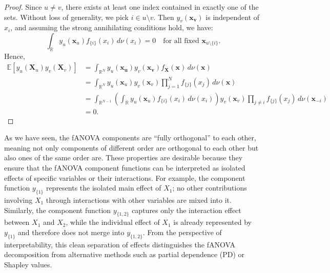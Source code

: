 \begin{proof}
Since $u \neq v$, there exists at least one index contained in exactly one of the sets.
Without loss of generality, we pick $i \in u \setminus v$.
Then $y_v(\boldsymbol{x_v})$ is independent of $x_i$, and assuming the strong annihilating conditions hold, we have:
\[
    \int_{\mathbb{R}} y_u(\boldsymbol{x}_u) f_{\{i\}}(x_i)\,d\nu(x_i) = 0
    \quad \text{for all fixed } \boldsymbol{x}_{u\setminus \{i\}}.
\]
Hence,
\begin{align*}
    \mathbb{E}[y_u(\boldsymbol{X}_u) y_v(\boldsymbol{X}_v)] &= \int_{\mathbb{R}^{N}} y_u(\boldsymbol{x_u}) y_v(\boldsymbol{x_v}) f_{\boldsymbol{X}}(\boldsymbol{x}) \, d\nu (\boldsymbol{x}) \\
    &= \int_{\mathbb{R}^{N}} y_u(\boldsymbol{x}_u) y_v(\boldsymbol{x}_v)
       \prod_{j=1}^N f_{\{j\}}(x_j)\, d\nu(\boldsymbol{x}) \\
    &= \int_{\mathbb{R}^{N-1}}
        \left(\int_{\mathbb{R}} y_u(\boldsymbol{x}_u) f_{\{i\}}(x_i)\,d\nu(x_i)\right)
        y_v(\boldsymbol{x}_v)\prod_{j \neq i} f_{\{j\}}(x_j)\,d\nu(\boldsymbol{x}_{-i})\\
    &= 0.
\end{align*}
\end{proof}


As we have seen, the fANOVA components are ``fully orthogonal'' to each other, meaning not only components of different order are orthogonal to each other but also ones of the same order are.
These properties are desirable because they ensure that the 
fANOVA component functions can be interpreted as 
isolated effects of specific variables or their interactions. 
For example, the component function $y_{\{1\}}$ represents the 
isolated main effect of $X_1$; no other contributions 
involving $X_1$ through interactions with other variables are mixed into it. 
Similarly, the component function $y_{\{1,2\}}$ captures only the 
interaction effect between $X_1$ and $X_2$, while the individual effect 
of $X_1$ is already represented by $y_{\{1\}}$ and therefore does not 
merge into $y_{\{1,2\}}$. 
From the perspective of interpretability, this clean separation of effects 
distinguishes the fANOVA decomposition from alternative methods such as 
partial dependence (PD) or Shapley values.

